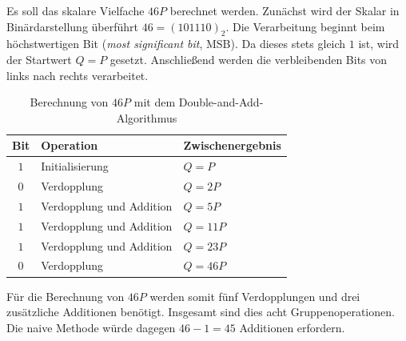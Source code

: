 \begin{beispiel}
    Es soll das skalare Vielfache $46P$ berechnet werden. Zunächst
    wird der Skalar in Binärdarstellung überführt \( 46={(101110)}_2\).
    Die Verarbeitung beginnt beim höchstwertigen Bit (\emph{most significant bit}, MSB). Da dieses stets gleich $1$ ist, wird der Startwert $Q=P$ gesetzt. Anschließend werden die
    verbleibenden Bits von links nach rechts verarbeitet.
    \begin{table}[htbp]
        \centering
        \begin{tabular}{c l l}
            \hline
            \textbf{Bit} & \textbf{Operation}       & \textbf{Zwischenergebnis} \\
            \hline
            $1$          & Initialisierung          & $Q=P$                     \\
            $0$          & Verdopplung              & $Q=2P$                    \\
            $1$          & Verdopplung und Addition & $Q=5P$                    \\
            $1$          & Verdopplung und Addition & $Q=11P$                   \\
            $1$          & Verdopplung und Addition & $Q=23P$                   \\
            $0$          & Verdopplung              & $Q=46P$                   \\
            \hline
        \end{tabular}
        \caption{Berechnung von $46P$ mit dem Double-and-Add-Algorithmus}\label{tab:double-and-add-26}
    \end{table}
    Für die Berechnung von $46P$ werden somit fünf Verdopplungen und drei zusätzliche Additionen benötigt. Insgesamt sind dies acht Gruppenoperationen. Die naive Methode würde dagegen $46-1=45$ Additionen erfordern.
\end{beispiel}
